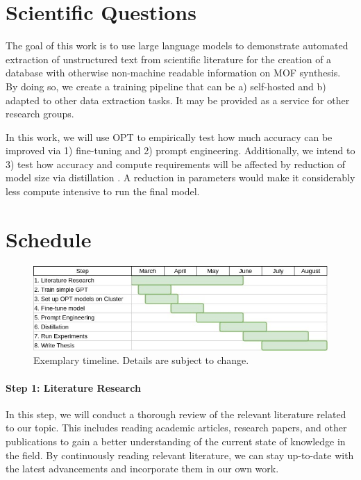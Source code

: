 \documentclass[a4paper,11pt]{article}
\newcommand{\margtodo}                                 %
{\marginpar{\textbf{\textcolor{red}{ToDo}}}{}}
\newcommand{\todo}[1]
{{\textbf{\textcolor{red}{[\margtodo{}#1]}}}{}}   %
\begin{document}

\section{Scientific Questions}
The goal of this work is to use large language models to demonstrate automated
extraction of unstructured text from scientific literature for the creation of
a database with otherwise non-machine readable information on MOF synthesis. By
doing so, we create a training pipeline that can be a) self-hosted and b)
adapted to other data extraction tasks. It may be provided as a service for
other research groups.

In this work, we will use OPT \cite{zhang_opt_2022} to empirically test how
much accuracy can be improved via 1) fine-tuning and 2) prompt engineering.
Additionally, we intend to 3) test how accuracy and compute requirements will be
affected by reduction of model size via distillation \cite{sun_patient_2019}.
A reduction in parameters would make it considerably less compute intensive to
run the final model.


\section{Schedule}
\begin{figure}[ht!]
    \includegraphics[width=\textwidth]{img/thesis_gantt}
    \caption{Exemplary timeline. Details are subject to change.}
\end{figure}


\paragraph{Step 1: Literature Research}
In this step, we will conduct a thorough review of the relevant literature
related to our topic. This includes reading academic articles, research papers,
and other publications to gain a better understanding of the current state of
knowledge in the field. By continuously reading relevant literature, we can
stay up-to-date with the latest advancements and incorporate them in our own
work.
\end{document}
